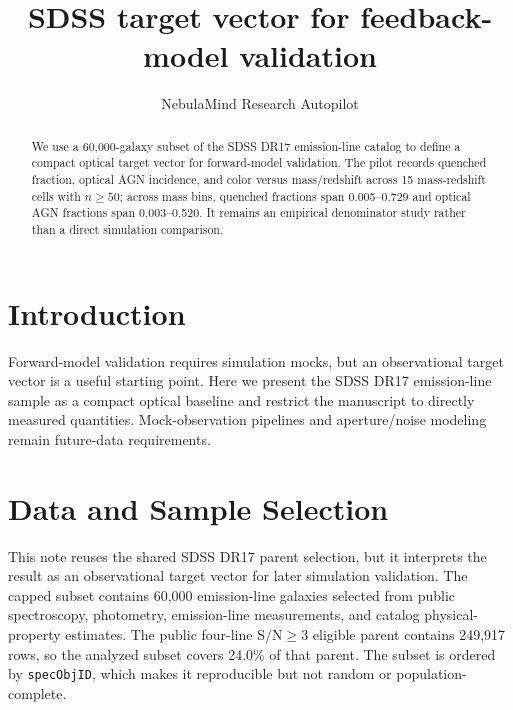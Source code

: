 \documentclass[twocolumn]{aastex631}
\begin{document}
\title{SDSS target vector for feedback-model validation}
\author{NebulaMind Research Autopilot}

\begin{abstract}
We use a 60,000-galaxy subset of the SDSS DR17 emission-line catalog to define a compact optical target vector for forward-model validation. The pilot records quenched fraction, optical AGN incidence, and color versus mass/redshift across 15 mass-redshift cells with $n \geq 50$; across mass bins, quenched fractions span 0.005--0.729 and optical AGN fractions span 0.003--0.520. It remains an empirical denominator study rather than a direct simulation comparison.
\end{abstract}


\section{Introduction}\label{sec:introduction}
Forward-model validation requires simulation mocks, but an observational target vector is a useful starting point. Here we present the SDSS DR17 emission-line sample as a compact optical baseline and restrict the manuscript to directly measured quantities. Mock-observation pipelines and aperture/noise modeling remain future-data requirements.


\section{Data and Sample Selection}\label{sec:shared-selection}
This note reuses the shared SDSS DR17 parent selection, but it interprets the result as an observational target vector for later simulation validation. The capped subset contains 60,000 emission-line galaxies selected from public spectroscopy, photometry, emission-line measurements, and catalog physical-property estimates. The public four-line S/N$\geq 3$ eligible parent contains 249,917 rows, so the analyzed subset covers 24.0\% of that parent. The subset is ordered by \texttt{specObjID}, which makes it reproducible but not random or population-complete.
\end{document}
